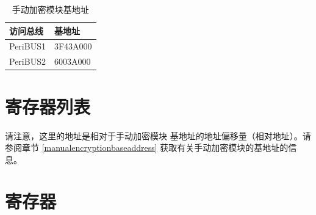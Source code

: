 \documentclass[main\_\_CN.tex]{subfiles}
\begin{document}
\begin{longtable}[c]{ | l | C{3cm} | }
\caption{手动加密模块基地址}\label{table:XTSENTRY}
\\\hline
{}
    访问总线      & 基地址\\
    \hline
PeriBUS1     & \hexprefix{}3F43A000      \\
    \hline
PeriBUS2     & \hexprefix{}6003A000      \\
    \hline
\end{longtable}

\hypertarget{extmemencr-reg-summ}{}
\section{ 寄存器列表 }

请注意，这里的地址是相对于手动加密模块 基地址的地址偏移量（相对地址）。请参阅章节 \ref{manualencryptionbaseaddress} 获取有关手动加密模块的基地址的信息。


\section{ 寄存器 }


\end{document}
